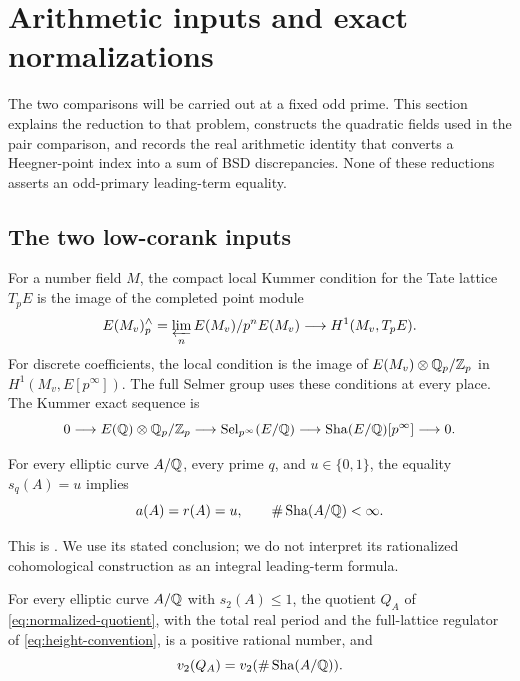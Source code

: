 \section{Arithmetic inputs and exact normalizations}\label{sec:classical}

The two comparisons will be carried out at a fixed odd prime. This
section explains the reduction to that problem, constructs the
quadratic fields used in the pair comparison, and records the real
arithmetic identity that converts a Heegner-point index into a sum of
BSD discrepancies. None of these reductions asserts an odd-primary
leading-term equality.

\subsection{The two low-corank inputs}

For a number field $M$, the compact local Kummer condition for the
Tate lattice $T_pE$ is the image of the completed point module
\[
 E(M_v)^{\wedge}_p=\varprojlim_n E(M_v)/p^nE(M_v)
       \longrightarrow H^1(M_v,T_pE).
\]
For discrete coefficients, the local condition is the image of
$E(M_v)\otimes\mathbb Q_p/\mathbb Z_p$ in $H^1(M_v,E[p^\infty])$. The full Selmer
group uses these conditions at every place. The Kummer exact sequence
is
\begin{equation}\label{eq:kummer-exact}
 0\longrightarrow E(\mathbb Q)\otimes\mathbb Q_p/\mathbb Z_p
 \longrightarrow\operatorname{Sel}_{p^\infty}(E/\mathbb Q)
 \longrightarrow\operatorname{Sha}(E/\mathbb Q)[p^\infty]\longrightarrow0.
\end{equation}

\begin{theorem}\label{classical:low-corank}
For every elliptic curve $A/\mathbb Q$, every prime $q$, and $u\in\{0,1\}$,
the equality $s_q(A)=u$ implies
\[
 a(A)=r(A)=u,\qquad \#\operatorname{Sha}(A/\mathbb Q)<\infty.
\]
\end{theorem}

This is \cite[Theorem~1.1]{C}. We use its stated conclusion;
we do not interpret its rationalized cohomological construction as
an integral leading-term formula.

\begin{theorem}\label{classical:two-primary}
For every elliptic curve $A/\mathbb Q$ with $s_2(A)\leq1$, the quotient
$Q_A$ of \eqref{eq:normalized-quotient}, with the total real period
and the full-lattice regulator of \eqref{eq:height-convention}, is a
positive rational number, and
\[
 v_2(Q_A)=v_2(\#\operatorname{Sha}(A/\mathbb Q)).
\]
\end{theorem}

